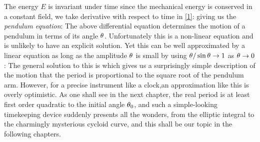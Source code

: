 The energy $E$ is invariant under time since the mechanical energy is
conserved in a constant field, we take derivative with respect to time in \eqref{1}:
giving us the {\it pendulum equation}:\cite{awrejcewicz2012classical}
The above differential equation determines the motion of a pendulum in terms of 
its angle $\theta$.  Unfortunately this is a non-linear equation and is unlikely to
 have an explicit solution. Yet this can be well approximated by a linear equation as long as the amplitude $\theta$ is small by using $\theta/\sin{\theta}\to 1$ as $\theta\to 0$:
 The general solution to this is 
 which gives us a surprisingly simple description of the motion that the period is proportional to the square root of the pendulum arm.  However, for a precise 
 instrument like a clock,an approximation like this is overly optimistic. As one
 shall see in the next chapter, the real period is at least first order quadratic to the 
 initial angle $\theta_0$, and such a simple-looking timekeeping device suddenly presents all the wonders, from the elliptic integral to the charmingly mysterious cycloid curve, and this shall be our topic in the following chapters.
 
 


